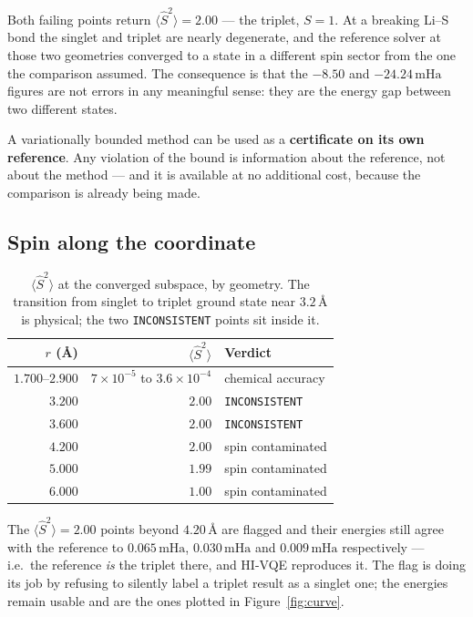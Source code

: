 \documentclass[11pt,a4paper]{article}
\newcommand{\mHa}{\ensuremath{\,\mathrm{mHa}}}
\newcommand{\Ang}{\ensuremath{\,\text{\AA}}}
\newcommand{\Ssq}{\ensuremath{\langle \hat{S}^2 \rangle}}
\newcommand{\code}[1]{\texttt{\small #1}}
\begin{document}
Both failing points return $\Ssq = 2.00$ --- the triplet, $S = 1$. At a breaking
Li--S bond the singlet and triplet are nearly degenerate, and the reference
solver at those two geometries converged to a state in a different spin sector
from the one the comparison assumed. The consequence is that the $-8.50$ and
$-24.24\mHa$ figures are not errors in any meaningful sense: they are the
energy gap between two different states.

\begin{result}
A variationally bounded method can be used as a \textbf{certificate on its own
reference}. Any violation of the bound is information about the reference, not
about the method --- and it is available at no additional cost, because the
comparison is already being made.
\end{result}

\subsection{Spin along the coordinate}

\begin{table}[htbp]
\centering
\caption{$\Ssq$ at the converged subspace, by geometry. The transition from
singlet to triplet ground state near $3.2\Ang$ is physical; the two
\code{INCONSISTENT} points sit inside it.}
\label{tab:spin}
\small
\begin{tabular}{rrl}
\toprule
$r$ (\AA) & $\Ssq$ & Verdict \\
\midrule
$1.700$--$2.900$ & $7\times10^{-5}$ to $3.6\times10^{-4}$ & chemical accuracy \\
$3.200$ & $2.00$ & \code{INCONSISTENT} \\
$3.600$ & $2.00$ & \code{INCONSISTENT} \\
$4.200$ & $2.00$ & spin contaminated \\
$5.000$ & $1.99$ & spin contaminated \\
$6.000$ & $1.00$ & spin contaminated \\
\bottomrule
\end{tabular}
\end{table}

The $\Ssq = 2.00$ points beyond $4.20\Ang$ are flagged and their energies still
agree with the reference to $0.065\mHa$, $0.030\mHa$ and $0.009\mHa$
respectively --- i.e.\ the reference \emph{is} the triplet there, and HI-VQE
reproduces it. The flag is doing its job by refusing to silently label a triplet
result as a singlet one; the energies remain usable and are the ones plotted in
Figure~\ref{fig:curve}.
\end{document}
